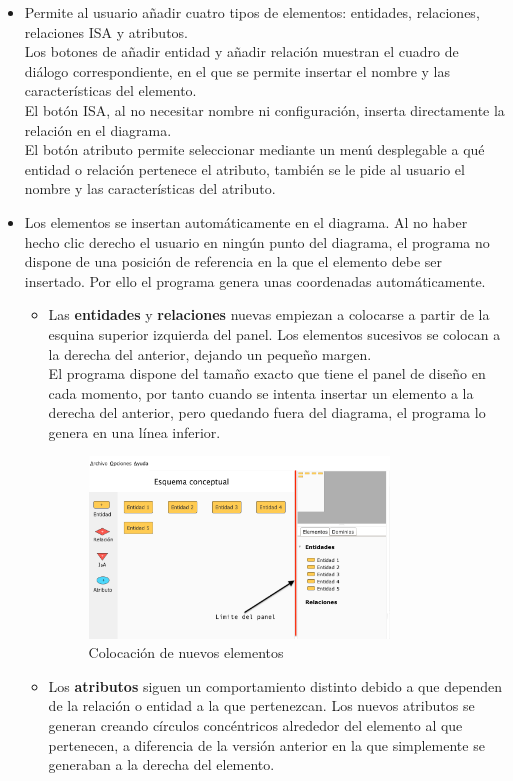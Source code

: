 \begin{itemize}
    \item Permite al usuario añadir cuatro tipos de elementos: entidades, relaciones, relaciones ISA y atributos.\\
    
    Los botones de añadir entidad y añadir relación muestran el cuadro de diálogo correspondiente, en el que se permite insertar el nombre y las características del elemento.\\
    
    El botón ISA, al no necesitar nombre ni configuración, inserta directamente la relación en el diagrama.\\
    
    El botón atributo permite seleccionar mediante un menú desplegable a qué entidad o relación pertenece el atributo, también se le pide al usuario el nombre y las características del atributo.
    \item Los elementos se insertan automáticamente en el diagrama. Al no haber hecho clic derecho el usuario en ningún punto del diagrama, el programa no dispone de una posición de referencia en la que el elemento debe ser insertado. Por ello el programa genera unas coordenadas automáticamente.
    \begin{itemize}
        \item Las \textbf{entidades} y \textbf{relaciones} nuevas empiezan a colocarse a partir de la esquina superior izquierda del panel. Los elementos sucesivos se colocan a la derecha del anterior, dejando un pequeño margen.\\
        
        El programa dispone del tamaño exacto que tiene el panel de diseño en cada momento, por tanto cuando se intenta insertar un elemento a la derecha del anterior, pero quedando fuera del diagrama, el programa lo genera en una línea inferior.
        \begin{figure}[H]
            \centering
            \includegraphics[width=0.8\textwidth]{img/limitepanel.png}
            \caption{Colocación de nuevos elementos}
        \end{figure}
        \item Los \textbf{atributos} siguen un comportamiento distinto debido a que dependen de la relación o entidad a la que pertenezcan. Los nuevos atributos se generan creando círculos concéntricos alrededor del elemento al que pertenecen, a diferencia de la versión anterior en la que simplemente se generaban a la derecha del elemento.\\
        

\end{itemize}
\end{itemize}
